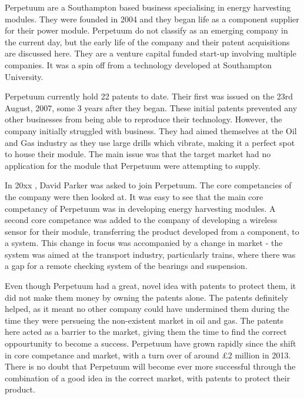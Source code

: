 {}


Perpetuum are a Southampton based business specialising in energy harvesting modules. 
They were founded in 2004 and they began life as a component supplier for their power module.
Perpetuum do not classify as an emerging company in the current day, but the early life of the company and their patent acquisitions are discussed here. 
They are a venture capital funded start-up involving multiple companies.
It was a spin off from a technology developed at Southampton University. 

Perpetuum currently hold 22 patents to date. 
Their first was issued on the 23rd August, 2007, some 3 years after they began.
These initial patents prevented any other businesses from being able to reproduce their technology. 
However, the company initially struggled with business.
They had aimed themselves at the Oil and Gas industry as they use large drills which vibrate, making it a perfect spot to house their module.
The main issue was that the target market had no application for the module that Perpetuum were attempting to supply. 

In 20xx , David Parker was asked to join Perpetuum. 
The core competancies of the company were then looked at.
It was easy to see that the main core competancy of Perpetuum was in developing energy harvesting modules. 
A second core competance was added to the company of developing a wireless sensor for their module, transferring the product developed from a component, to a system.
This change in focus was accompanied by a change in market - the system was aimed at the transport industry, particularly trains, where there was a gap for a remote checking system of the bearings and suspension. 

Even though Perpetuum had a great, novel idea with patents to protect them, it did not make them money by owning the patents alone.
The patents definitely helped, as it meant no other company could have undermined them during the time they were persueing the non-existent market in oil and gas.
The patents here acted as a barrier to the market, giving them the time to find the correct oppourtunity to become a success.
Perpetuum have grown rapidly since the shift in core competance and market, with a turn over of around \pounds 2 million in 2013.
There is no doubt that Perpetuum will become ever more successful through the combination of a good idea in the correct market, with patents to protect their product. 

